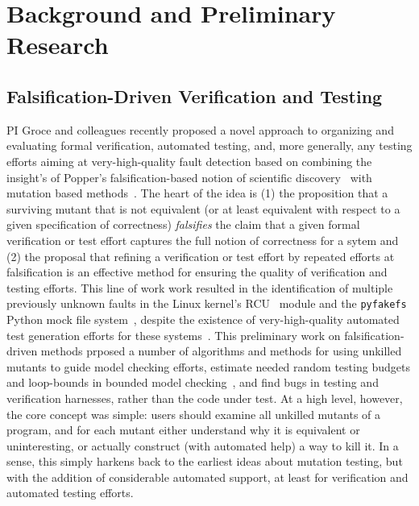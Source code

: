 \section{Background and Preliminary Research}

\subsection{Falsification-Driven Verification and Testing}

PI Groce and colleagues recently proposed a novel approach to organizing and evaluating
formal verification, automated testing, and, more generally, any
testing efforts aiming at very-high-quality fault detection based on
combining the insight's of Popper's falsification-based notion of
scientific discovery~\cite{Popper,popperconjectures} with mutation
based methods~\cite{groce2015verified,groce2018verified,mutKernel}.
The heart of the idea is (1) the proposition that a surviving mutant that is not
equivalent (or at least equivalent with respect to a given
specification of correctness) \emph{falsifies} the claim that a given
formal verification or test effort captures the full notion of
correctness for a sytem and (2) the proposal that refining a
verification or test effort by repeated efforts at falsification is an
effective method for ensuring the quality of verification and testing
efforts.  This line of work
work resulted in the identification of multiple previously unknown faults in
the Linux kernel's
RCU~\cite{MathieuDesnoyers2012URCU,DinakarGuniguntala2008IBMSysJ,McKenney:2013:SDS:2483852.2483867}
module and the {\tt pyfakefs} Python mock file
system~\cite{pyfakefs}, despite the existence of very-high-quality
automated test generation efforts for these
systems~\cite{rcutorture,TSTL}.  This preliminary work on
falsification-driven methods prposed a number of algorithms and
methods for using unkilled mutants to guide model checking efforts,
estimate needed random testing budgets and loop-bounds in bounded model
checking~\cite{CBMCp,BMC}, and find bugs in testing and verification
harnesses, rather than the code under test.  At a high level, however,
the core concept was simple:  users should examine all unkilled
mutants of a program, and for each mutant either understand why it is
equivalent or uninteresting, or actually construct (with automated
help) a way to kill it.  In a sense, this simply harkens back to the
earliest ideas about mutation testing, but with the addition of
considerable automated support, at least for verification and
automated testing efforts.

